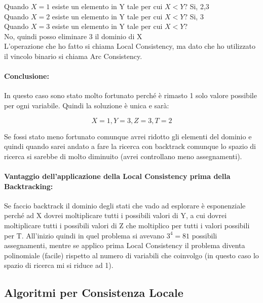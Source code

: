 Quando $X=1$ esiste un elemento in Y tale per cui $X < Y$? Si, 2,3\\
Quando $X=2$ esiste un elemento in Y tale per cui $X < Y$? Si, 3\\
Quando $X=3$ esiste un elemento in Y tale per cui $X < Y$?\\
No, quindi posso eliminare 3 il dominio di X\\

L'operazione che ho fatto si chiama Local Consistency, ma dato che ho utilizzato
il vincolo binario si chiama Arc Consistency.\\

\paragraph{Conclusione:} In questo caso sono stato molto fortunato perché
è rimasto 1 solo valore possibile per ogni variabile. Quindi la soluzione è
unica e sarà:

$$
    X = 1, Y = 3, Z = 3, T = 2
$$

Se fossi stato meno fortunato comunque avrei ridotto gli elementi del dominio e
quindi quando sarei andato a fare la ricerca con backtrack comunque lo spazio di
ricerca si sarebbe di molto diminuito (avrei controllano meno assegnamenti).

\paragraph{Vantaggio dell'applicazione della Local Consistency prima della Backtracking:}
Se faccio backtrack il dominio degli stati che
vado ad esplorare è esponenziale perché ad X dovrei moltiplicare tutti i
possibili valori di Y, a cui dovrei moltiplicare tutti i possibili valori di Z
che moltiplico per tutti i valori possibili per T. All'inizio quindi in quel
problema si avevano $3^4 = 81$ possibili assegnamenti, mentre se applico prima
Local Consistency il problema diventa polinomiale (facile) rispetto al numero di
variabili che coinvolgo (in questo caso lo spazio di ricerca mi si riduce ad 1).

\subsection{Algoritmi per Consistenza Locale}
